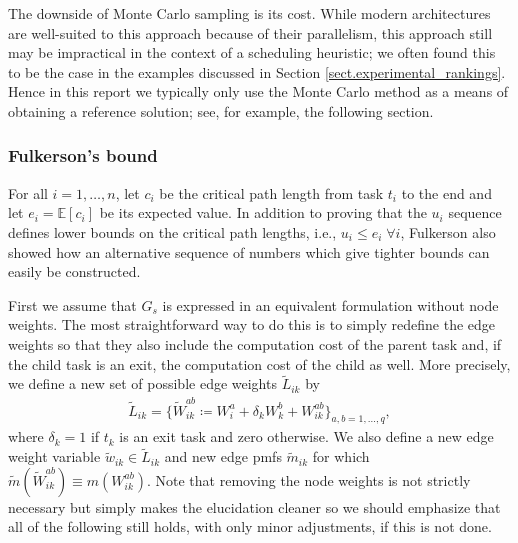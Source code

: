 \documentclass[12pt]{article}
\def\E{\mathbb{E}}
\begin{document}
The downside of Monte Carlo sampling is its cost. While modern architectures are well-suited to this approach because of their parallelism, this approach still may be impractical in the context of a scheduling heuristic; we often found this to be the case in the examples discussed in Section \ref{sect.experimental_rankings}. Hence in this report we typically only use the Monte Carlo method as a means of obtaining a reference solution; see, for example, the following section. 

\subsubsection{Fulkerson's bound}
\label{subsubsect.fulkerson}

For all $i = 1, \dots, n$, let $c_i$ be the critical path length from task $t_i$ to the end and let $e_i = \E[c_i]$ be its expected value. In addition to proving that the $u_i$ sequence defines lower bounds on the critical path lengths, i.e., $u_i \leq e_i \; \forall i$, Fulkerson also showed how an alternative sequence of numbers which give tighter bounds can easily be constructed.

First we assume that $G_s$ is expressed in an equivalent formulation without node weights. The most straightforward way to do this is to simply redefine the edge weights so that they also include the computation cost of the parent task and, if the child task is an exit, the computation cost of the child as well. More precisely, we define a new set of possible edge weights $\tilde{L}_{ik}$ by 
\begin{align*}
\tilde{L}_{ik} = \{ \tilde{W}_{ik}^{ab} \coloneqq W_i^a + \delta_k W_k^b + W_{ik}^{ab} \}_{a, b = 1, \dots, q}, 
\end{align*}
where $\delta_k = 1$ if $t_k$ is an exit task and zero otherwise. We also define a new edge weight variable $\tilde{w}_{ik} \in \tilde{L}_{ik}$ and new edge pmfs $\tilde{m}_{ik}$ for which $\tilde{m}(\tilde{W}_{ik}^{ab}) \equiv m(W_{ik}^{ab})$. Note that removing the node weights is not strictly necessary but simply makes the elucidation cleaner so we should emphasize that all of the following still holds, with only minor adjustments, if this is not done.
\end{document}
